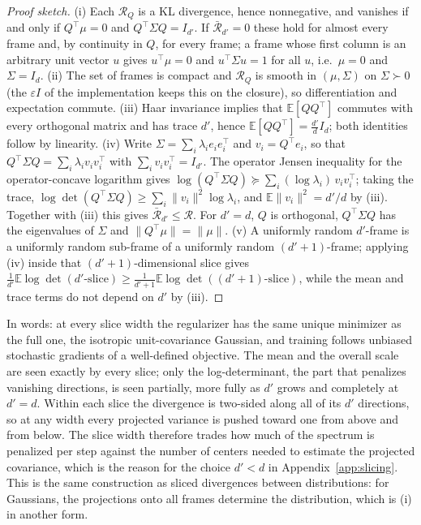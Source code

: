 \begin{proof}[Proof sketch]
(i) Each $\mathcal R_Q$ is a KL divergence, hence nonnegative, and vanishes if and only if $Q^\top\mu=0$ and $Q^\top\Sigma Q=I_{d'}$. If $\bar{\mathcal R}_{d'}=0$ these hold for almost every frame and, by continuity in $Q$, for every frame; a frame whose first column is an arbitrary unit vector $u$ gives $u^\top\mu=0$ and $u^\top\Sigma u=1$ for all $u$, i.e.\ $\mu=0$ and $\Sigma=I_d$. (ii) The set of frames is compact and $\mathcal R_Q$ is smooth in $(\mu,\Sigma)$ on $\Sigma\succ0$ (the $\varepsilon I$ of the implementation keeps this on the closure), so differentiation and expectation commute. (iii) Haar invariance implies that $\mathbb E[QQ^\top]$ commutes with every orthogonal matrix and has trace $d'$, hence $\mathbb E[QQ^\top]=\frac{d'}{d}I_d$; both identities follow by linearity. (iv) Write $\Sigma=\sum_i\lambda_ie_ie_i^\top$ and $v_i=Q^\top e_i$, so that $Q^\top\Sigma Q=\sum_i\lambda_iv_iv_i^\top$ with $\sum_iv_iv_i^\top=I_{d'}$. The operator Jensen inequality for the operator-concave logarithm gives $\log(Q^\top\Sigma Q)\succeq\sum_i(\log\lambda_i)\,v_iv_i^\top$; taking the trace, $\log\det(Q^\top\Sigma Q)\ge\sum_i\|v_i\|^2\log\lambda_i$, and $\mathbb E\|v_i\|^2=d'/d$ by (iii). Together with (iii) this gives $\bar{\mathcal R}_{d'}\le\mathcal R$. For $d'=d$, $Q$ is orthogonal, $Q^\top\Sigma Q$ has the eigenvalues of $\Sigma$ and $\|Q^\top\mu\|=\|\mu\|$. (v) A uniformly random $d'$-frame is a uniformly random sub-frame of a uniformly random $(d'+1)$-frame; applying (iv) inside that $(d'+1)$-dimensional slice gives $\frac{1}{d'}\mathbb E\log\det(\text{$d'$-slice})\ge\frac{1}{d'+1}\mathbb E\log\det(\text{$(d'+1)$-slice})$, while the mean and trace terms do not depend on $d'$ by (iii).
\end{proof}

In words: at every slice width the regularizer has the same unique minimizer as the full one, the isotropic unit-covariance Gaussian, and training follows unbiased stochastic gradients of a well-defined objective. The mean and the overall scale are seen exactly by every slice; only the log-determinant, the part that penalizes vanishing directions, is seen partially, more fully as $d'$ grows and completely at $d'=d$. Within each slice the divergence is two-sided along all of its $d'$ directions, so at any width every projected variance is pushed toward one from above and from below. The slice width therefore trades how much of the spectrum is penalized per step against the number of centers needed to estimate the projected covariance, which is the reason for the choice $d'<d$ in Appendix~\ref{app:slicing}. This is the same construction as sliced divergences between distributions: for Gaussians, the projections onto all frames determine the distribution, which is (i) in another form.
